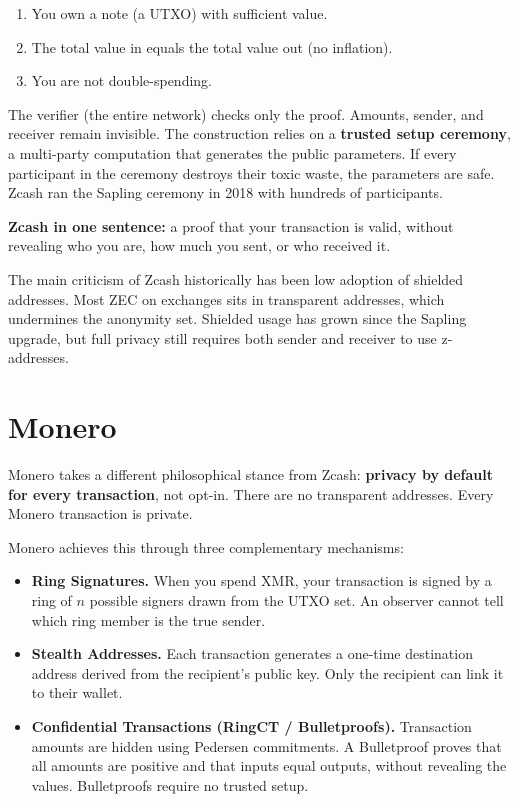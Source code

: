 \begin{enumerate}
  \item You own a note (a UTXO) with sufficient value.
  \item The total value in equals the total value out (no inflation).
  \item You are not double-spending.
\end{enumerate}

The verifier (the entire network) checks only the proof. Amounts, sender, and receiver remain invisible. The construction relies on a \textbf{trusted setup ceremony}, a multi-party computation that generates the public parameters. If every participant in the ceremony destroys their toxic waste, the parameters are safe. Zcash ran the Sapling ceremony in 2018 with hundreds of participants.

\begin{highlight}
\textbf{Zcash in one sentence:} a proof that your transaction is valid, without revealing who you are, how much you sent, or who received it.
\end{highlight}

The main criticism of Zcash historically has been low adoption of shielded addresses. Most ZEC on exchanges sits in transparent addresses, which undermines the anonymity set. Shielded usage has grown since the Sapling upgrade, but full privacy still requires both sender and receiver to use z-addresses.

\section{Monero} \label{sec:monero}

Monero takes a different philosophical stance from Zcash: \textbf{privacy by default for every transaction}, not opt-in. There are no transparent addresses. Every Monero transaction is private.

Monero achieves this through three complementary mechanisms:

\begin{itemize}
  \item \textbf{Ring Signatures.} When you spend XMR, your transaction is signed by a ring of $n$ possible signers drawn from the UTXO set. An observer cannot tell which ring member is the true sender.
  \item \textbf{Stealth Addresses.} Each transaction generates a one-time destination address derived from the recipient's public key. Only the recipient can link it to their wallet.
  \item \textbf{Confidential Transactions (RingCT / Bulletproofs).} Transaction amounts are hidden using Pedersen commitments. A Bulletproof proves that all amounts are positive and that inputs equal outputs, without revealing the values. Bulletproofs require no trusted setup.
\end{itemize}

